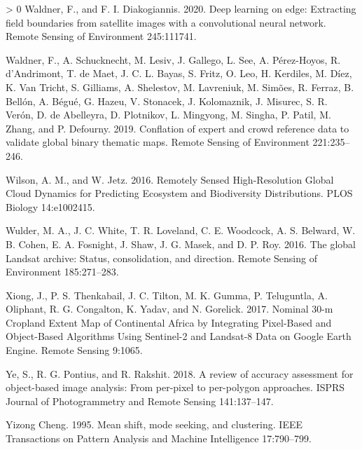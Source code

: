 \documentclass[11pt,a4paper]{article}
\newlength{\cslhangindent}
\newenvironment{CSLReferences}[3] %
 {%
  \setlength{\parindent}{0pt}
  \ifodd #1 \everypar{\setlength{\hangindent}{\cslhangindent}}\ignorespaces\fi
  \ifnum #2 > 0
  \setlength{\parskip}{#2\baselineskip}
  \fi
 }%
 {}
\begin{document}
\begin{CSLReferences}{1}{0}
\leavevmode\hypertarget{ref-waldnerDeepLearningEdge2020}{}%
Waldner, F., and F. I. Diakogiannis. 2020. Deep learning on edge:
{Extracting} field boundaries from satellite images with a convolutional
neural network. Remote Sensing of Environment 245:111741.

\leavevmode\hypertarget{ref-WaldnerConflationexpertcrowd2019}{}%
Waldner, F., A. Schucknecht, M. Lesiv, J. Gallego, L. See, A.
Pérez-Hoyos, R. d'Andrimont, T. de Maet, J. C. L. Bayas, S. Fritz, O.
Leo, H. Kerdiles, M. Díez, K. Van Tricht, S. Gilliams, A. Shelestov, M.
Lavreniuk, M. Simões, R. Ferraz, B. Bellón, A. Bégué, G. Hazeu, V.
Stonacek, J. Kolomaznik, J. Misurec, S. R. Verón, D. de Abelleyra, D.
Plotnikov, L. Mingyong, M. Singha, P. Patil, M. Zhang, and P. Defourny.
2019. Conflation of expert and crowd reference data to validate global
binary thematic maps. Remote Sensing of Environment 221:235--246.

\leavevmode\hypertarget{ref-WilsonRemotelySensedHighResolution2016}{}%
Wilson, A. M., and W. Jetz. 2016. Remotely {Sensed High}-{Resolution
Global Cloud Dynamics} for {Predicting Ecosystem} and {Biodiversity
Distributions}. PLOS Biology 14:e1002415.

\leavevmode\hypertarget{ref-WulderglobalLandsatarchive2016}{}%
Wulder, M. A., J. C. White, T. R. Loveland, C. E. Woodcock, A. S.
Belward, W. B. Cohen, E. A. Fosnight, J. Shaw, J. G. Masek, and D. P.
Roy. 2016. The global {Landsat} archive: {Status}, consolidation, and
direction. Remote Sensing of Environment 185:271--283.

\leavevmode\hypertarget{ref-XiongNominal30mCropland2017}{}%
Xiong, J., P. S. Thenkabail, J. C. Tilton, M. K. Gumma, P. Teluguntla,
A. Oliphant, R. G. Congalton, K. Yadav, and N. Gorelick. 2017. Nominal
30-m {Cropland Extent Map} of {Continental Africa} by {Integrating
Pixel}-{Based} and {Object}-{Based Algorithms Using Sentinel}-2 and
{Landsat}-8 {Data} on {Google Earth Engine}. Remote Sensing 9:1065.

\leavevmode\hypertarget{ref-yeReviewAccuracyAssessment2018}{}%
Ye, S., R. G. Pontius, and R. Rakshit. 2018. A review of accuracy
assessment for object-based image analysis: {From} per-pixel to
per-polygon approaches. ISPRS Journal of Photogrammetry and Remote
Sensing 141:137--147.

\leavevmode\hypertarget{ref-YizongChengMeanshiftmode1995a}{}%
Yizong Cheng. 1995. Mean shift, mode seeking, and clustering. IEEE
Transactions on Pattern Analysis and Machine Intelligence 17:790--799.


\end{CSLReferences}
\end{document}
